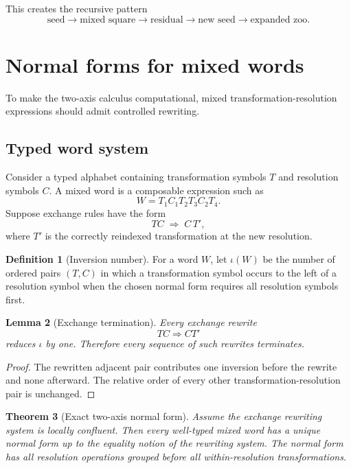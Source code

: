 \documentclass[11pt]{article}
\newtheorem{theorem}{Theorem}[section]
\newtheorem{lemma}[theorem]{Lemma}
\theoremstyle{definition}
\newtheorem{definition}[theorem]{Definition}
\theoremstyle{remark}
\begin{document}
This creates the recursive pattern
\[
\text{seed}
\to
\text{mixed square}
\to
\text{residual}
\to
\text{new seed}
\to
\text{expanded zoo}.
\]

\section{Normal forms for mixed words}

To make the two-axis calculus computational, mixed transformation-resolution expressions should admit controlled rewriting.

\subsection{Typed word system}

Consider a typed alphabet containing transformation symbols $T$ and resolution symbols $C$. A mixed word is a composable expression such as
\[
W=T_1C_1T_2T_3C_2T_4.
\]
Suppose exchange rules have the form
\[
TC\;\Rightarrow\;C\,T',
\]
where $T'$ is the correctly reindexed transformation at the new resolution.

\begin{definition}[Inversion number]
For a word $W$, let $\iota(W)$ be the number of ordered pairs $(T,C)$ in which a transformation symbol occurs to the left of a resolution symbol when the chosen normal form requires all resolution symbols first.
\end{definition}

\begin{lemma}[Exchange termination]\label{lem:termination}
Every exchange rewrite
\[
TC\Rightarrow CT'
\]
reduces $\iota$ by one. Therefore every sequence of such rewrites terminates.
\end{lemma}

\begin{proof}
The rewritten adjacent pair contributes one inversion before the rewrite and none afterward. The relative order of every other transformation-resolution pair is unchanged.
\end{proof}

\begin{theorem}[Exact two-axis normal form]\label{thm:normal-form}
Assume the exchange rewriting system is locally confluent. Then every well-typed mixed word has a unique normal form up to the equality notion of the rewriting system. The normal form has all resolution operations grouped before all within-resolution transformations.
\end{theorem}
\end{document}
